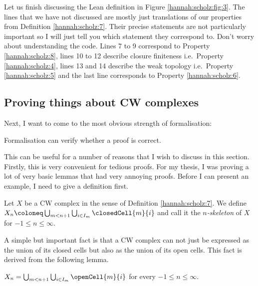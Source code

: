 Let us finish discussing the Lean definition in Figure \ref{hannah:scholz:fig:3}. The lines that we have not discussed are mostly just translations of our properties from Definition \ref{hannah:scholz:7}. Their precise statements are not particularly important so I will just tell you which statement they correspond to. Don't worry about understanding the code. Lines 7 to 9 correspond to Property \ref{hannah:scholz:8}, lines 10 to 12 describe closure finiteness i.e.\ Property \ref{hannah:scholz:4}, lines 13 and 14 describe the weak topology i.e.\ Property \ref{hannah:scholz:5} and the last line corresponds to Property \ref{hannah:scholz:6}.

\subsection*{Proving things about CW complexes}

Next, I want to come to the most obvious strength of formalisation: 

\begin{strength}\label{hannah:scholz:strength:2}
    Formalisation can verify whether a proof is correct.
\end{strength}

This can be useful for a number of reasons that I wish to discuss in this section. 
Firstly, this is very convenient for tedious proofs. For my thesis, I was proving a lot of very basic lemmas that had very annoying proofs. Before I can present an example, I need to give a definition first. 

\begin{definition}
Let $X$ be a CW complex in the sense of Definition \ref{hannah:scholz:7}. We define $X_n \coloneq \bigcup_{m < n + 1} \bigcup_{i \in I_m} \closedCell{m}{i}$ and call it the \emph{$n$-skeleton} of $X$ for $-1 \le n \le \infty$.
\end{definition}

A simple but important fact is that a CW complex can not just be expressed as the union of its closed cells but also as the union of its open cells. This fact is derived from the following lemma. 

\begin{lemma}\label{hannah:scholz:lem:1}
    $X_n = \bigcup_{m < n + 1}\bigcup_{i \in I_m} \openCell{m}{i}$ for every $-1 \le n \le \infty$.
\end{lemma}

